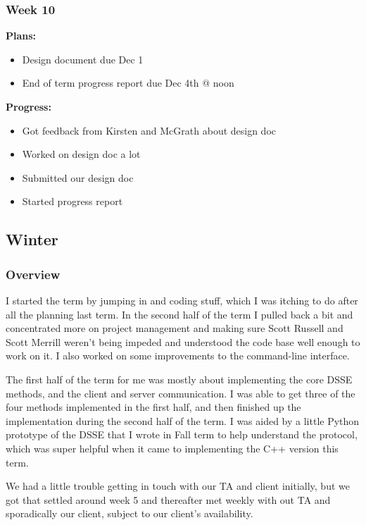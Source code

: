 \subsubsection{Week 10}

\noindent \textbf{Plans:}
\begin{itemize}
\item Design document due Dec 1
\item End of term progress report due Dec 4th @ noon
\end{itemize}

\noindent \textbf{Progress:}

\begin{itemize}
\item Got feedback from Kirsten and McGrath about design doc
\item Worked on design doc a lot
\item Submitted our design doc
\item Started progress report
\end{itemize}

\subsection{Winter}
\subsubsection{Overview}

I started the term by jumping in and coding stuff, which I was itching to do after all the planning last term.
In the second half of the term I pulled back a bit and concentrated more on project management and making sure
Scott Russell and Scott Merrill weren't being impeded and understood the code base well enough to work on it.
I also worked on some improvements to the command-line interface.

The first half of the term for me was mostly about implementing the core DSSE methods, and the client and server communication. I was able to get three of the four methods implemented in the first half, and then finished up the implementation during the second half of the term.  I was aided by a little Python prototype of the DSSE that I wrote in Fall term to help understand the protocol, which was super helpful when it came to implementing the C++ version this term.

We had a little trouble getting in touch with our TA and client initially, but we got that settled around week 5 and thereafter met weekly with out TA and sporadically our client, subject to our client's availability.

